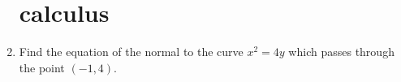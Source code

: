 
\begin{enumerate}
\section*{calculus} 
\item Find the equation of the normal to the curve ${x}^2 = 4y$ which passes through the point $(-1, 4).$       
\end{enumerate}
